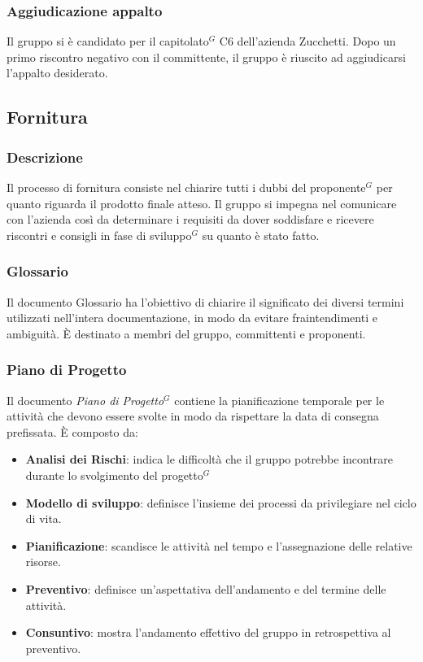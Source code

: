 \documentclass[a4paper,10pt]{article}
\begin{document}
\subsubsection{Aggiudicazione appalto}
Il gruppo si è candidato per il capitolato$^G$ C6 dell'azienda Zucchetti. Dopo un primo riscontro negativo con il committente,
il gruppo è riuscito ad aggiudicarsi l'appalto desiderato.

\subsection{Fornitura}
\subsubsection{Descrizione}
Il processo di fornitura consiste nel chiarire tutti i dubbi del proponente$^G$ per quanto riguarda il prodotto finale atteso.
Il gruppo si impegna nel comunicare con l'azienda così da determinare i requisiti da dover soddisfare e ricevere riscontri
e consigli in fase di sviluppo$^G$ su quanto è stato fatto. 
\subsubsection{Glossario}
Il documento Glossario ha l'obiettivo di chiarire il significato dei diversi termini utilizzati nell'intera documentazione,
in modo da evitare fraintendimenti e ambiguità. È destinato a membri del gruppo, committenti e proponenti.
\subsubsection{Piano di Progetto}
Il documento \textit{Piano di Progetto$^G$} contiene la pianificazione temporale per le attività che devono essere svolte 
in modo da rispettare la data di consegna prefissata. È composto da:
\begin{itemize}
    \item \textbf{Analisi dei Rischi}: indica le difficoltà che il gruppo potrebbe incontrare durante lo svolgimento del progetto$^G$
    \item \textbf{Modello di sviluppo}: definisce l'insieme dei processi da privilegiare nel ciclo di vita.
    \item \textbf{Pianificazione}: scandisce le attività nel tempo e l'assegnazione delle relative risorse.
    \item \textbf{Preventivo}: definisce un'aspettativa dell'andamento e del termine delle attività.
    \item \textbf{Consuntivo}: mostra l'andamento effettivo del gruppo in retrospettiva al preventivo.
\end{itemize}
\end{document}
